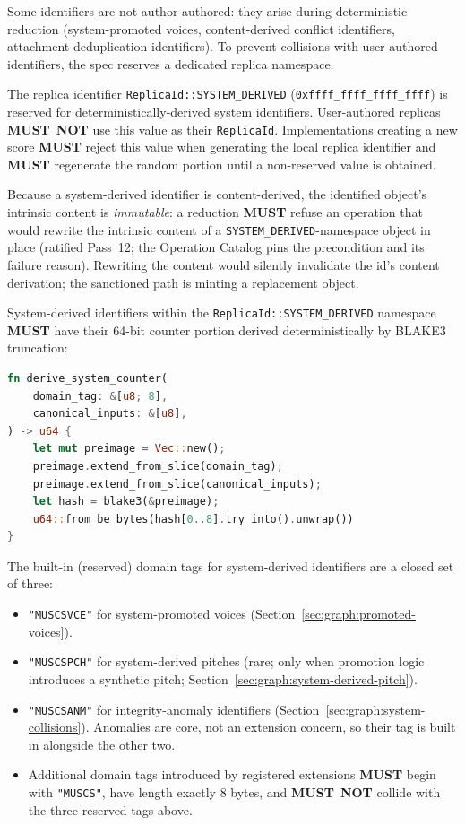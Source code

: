 \documentclass[11pt,letterpaper]{report}
\newcounter{requirement}[chapter]
\newcommand{\MUST}{\textbf{MUST}}
\newcommand{\MUSTNOT}{\textbf{MUST}\nobreak\ \textbf{NOT}}
\begin{document}
Some identifiers are not author-authored: they arise during
deterministic reduction (system-promoted voices, content-derived
conflict identifiers, attachment-deduplication identifiers). To
prevent collisions with user-authored identifiers, the spec
reserves a dedicated replica namespace.

\begin{requirement}
  \label{req:graph:system-derived-namespace}
  The replica identifier \texttt{ReplicaId::SYSTEM\_DERIVED}
  (\texttt{0xffff\_ffff\_ffff\_ffff}) is reserved for
  deterministically-derived system identifiers. User-authored
  replicas \MUSTNOT{} use this value as their \texttt{ReplicaId}.
  Implementations creating a new score \MUST{} reject this value
  when generating the local replica identifier and \MUST{}
  regenerate the random portion until a non-reserved value is
  obtained.

  Because a system-derived identifier is content-derived, the
  identified object's intrinsic content is \emph{immutable}: a
  reduction \MUST{} refuse an operation that would rewrite the
  intrinsic content of a \texttt{SYSTEM\_DERIVED}-namespace object
  in place (ratified Pass~12; the Operation Catalog pins the
  precondition and its failure reason). Rewriting the content would
  silently invalidate the id's content derivation; the sanctioned
  path is minting a replacement object.

  System-derived identifiers within the
  \texttt{ReplicaId::SYSTEM\_DERIVED} namespace \MUST{} have their
  64-bit counter portion derived deterministically by BLAKE3
  truncation:

  \begin{lstlisting}[language=Rust]
fn derive_system_counter(
    domain_tag: &[u8; 8],
    canonical_inputs: &[u8],
) -> u64 {
    let mut preimage = Vec::new();
    preimage.extend_from_slice(domain_tag);
    preimage.extend_from_slice(canonical_inputs);
    let hash = blake3(&preimage);
    u64::from_be_bytes(hash[0..8].try_into().unwrap())
}
  \end{lstlisting}

  The built-in (reserved) domain tags for system-derived identifiers
  are a closed set of three:
  \begin{itemize}
    \item \texttt{"MUSCSVCE"} for system-promoted voices
      (Section~\ref{sec:graph:promoted-voices}).
    \item \texttt{"MUSCSPCH"} for system-derived pitches (rare;
      only when promotion logic introduces a synthetic pitch;
      Section~\ref{sec:graph:system-derived-pitch}).
    \item \texttt{"MUSCSANM"} for integrity-anomaly identifiers
      (Section~\ref{sec:graph:system-collisions}). Anomalies are
      core, not an extension concern, so their tag is built in
      alongside the other two.
    \item Additional domain tags introduced by registered
      extensions \MUST{} begin with \texttt{"MUSCS"}, have length
      exactly 8 bytes, and \MUSTNOT{} collide with the three
      reserved tags above.
  \end{itemize}


\end{requirement}
\end{document}
